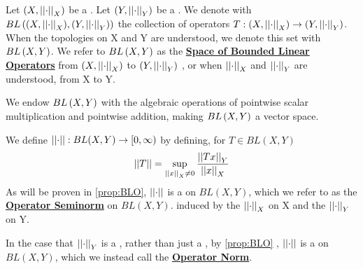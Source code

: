 \label{def:BLO} 
\newcommand{\SpaceOfBoundedLinearOperators}[0]{\textbf{\hyperref[def:BLO]{Space of Bounded Linear Operators}}\xspace}
\newcommand{\OperatorSeminorm}[0]{\textbf{\hyperref[def:BLO]{Operator Seminorm}}\xspace}
\newcommand{\OperatorNorm}[0]{\textbf{\hyperref[def:BLO]{Operator Norm}}\xspace}
\begin{df}
Let $(X,\left|\left| \cdot \right|\right|_X)$ be a \NonDegenerate \SeminormedSpace.
Let $(Y, \left|\left| \cdot \right|\right|_Y)$ be a \SeminormedSpace.
We denote with $BL\left( (X,\left|\left| \cdot \right|\right|_X), (Y, \left|\left| \cdot \right|\right|_Y)\right)$ 
the collection of
\ContinuousFunction
\Linear
operators
$T:(X, \left|\left| \cdot \right|\right|_X) \to (Y, \left|\left| \cdot \right|\right|_Y)$. 
When the topologies on X and Y are understood, we denote this set with
$BL\left( X,Y\right)$. 
We refer to $BL\left( X,Y\right)$ as the \SpaceOfBoundedLinearOperators 
from $(X, \left|\left| \cdot \right|\right|_X)$ to $(Y, \left|\left| \cdot \right|\right|_Y)$ 
, or when $\left|\left| \cdot \right|\right|_X$ and $\left|\left| \cdot \right|\right|_Y$ are understood, 
from X to Y. 

We endow $BL\left( X,Y\right)$ with the algebraic operations
of pointwise scalar multiplication
and pointwise addition, making $BL\left( X,Y\right)$ a vector space. 

We define $\left|\left| \cdot \right|\right|:BL(X,Y) \to [0,\infty)$ by defining, 
for $T \in BL(X,Y)$
\begin{equation}
    \left|\left| T \right|\right| = \sup\limits_{\left|\left| x \right|\right|_X \neq 0} \frac{\left|\left| Tx \right|\right|_Y}{\left|\left| x \right|\right|_X}
\end{equation}
As will be proven in \ref{prop:BLO}, $\left|\left| \cdot \right|\right|$ is a \Seminorm on $BL(X,Y)$, which 
we refer to as the \OperatorSeminorm on $BL(X,Y)$. induced by the
\Seminorm $\left|\left| \cdot \right|\right|_X$ on X and the \Seminorm $\left|\left| \cdot \right|\right|_Y$ on Y. 

In the case that $\left|\left| \cdot \right|\right|_{Y}$ is a \Norm, rather than just a \Seminorm, by \ref{prop:BLO}
, $\left|\left| \cdot \right|\right|$ is a \Norm on $BL(X,Y)$, which we instead call the \OperatorNorm. 
\end{df}
